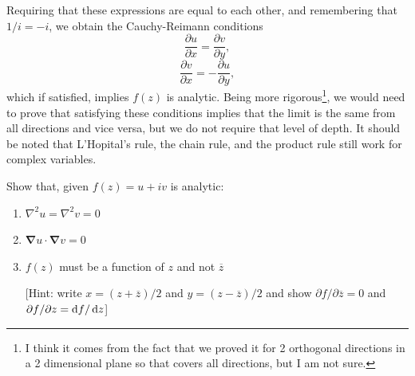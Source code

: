%
Requiring that these expressions are equal to each other, and remembering that $1/i=-i$, we obtain the Cauchy-Reimann conditions
%
\begin{equation}
	\frac{\partial u}{\partial x}=\frac{\partial v}{\partial y},
\end{equation}
%
\begin{equation*}
	\frac{\partial v}{\partial x}=-\frac{\partial u}{\partial y}, 
\end{equation*}
%
which if satisfied, implies $f(z)$ is analytic.
 Being more rigorous\footnote{I think it comes from the fact that we proved it for 2 orthogonal directions in a 2 dimensional plane so that covers all directions, but I am not sure.}, we would need to prove that satisfying these conditions implies that the limit is the same from all directions and vice versa, but we do not require that level of depth. 
 It should be noted that L'Hopital's rule, the chain rule, and the product rule still work for complex variables.
%
%
\begin{examples}
	Show that, given $f(z)=u+iv$ is analytic:
	\begin{enumerate}
		\item $\nabla^2u=\nabla^2v=0$
		\item $\pmb{\nabla} u \cdot \pmb{\nabla} v=0$
		\item $f(z)$ must be a function of $z$ and not $\overline{z}$
		
		[Hint: write $x=(z+\overline{z})/2$ and $y=(z-\overline{z})/2$ and show $\partial f/\partial \overline{z}=0$ and $\partial f/\partial z=\mathop{}\!\mathrm{d} f/\mathop{}\!\mathrm{d} z$]
	\end{enumerate}
\end{examples}

